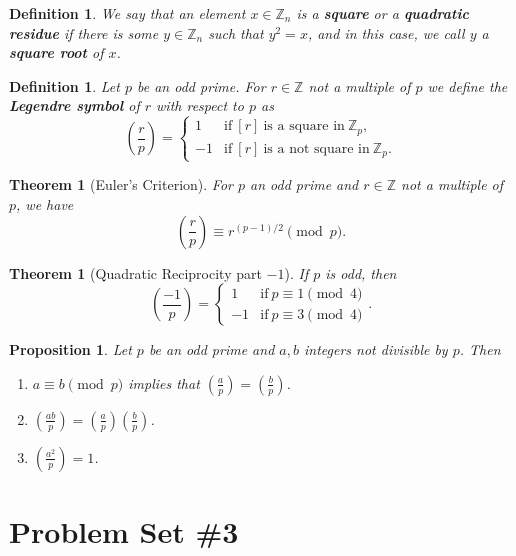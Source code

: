 \documentclass[12pt]{amsart}
\newcommand{\Z}{\mathbb{Z}}
\numberwithin{equation}{section}
\theoremstyle{plain} %
\newtheorem{thm}	[section]	{Theorem}
\newtheorem{prop}	[section]	{Proposition}
\newtheorem{defn}	[section]	{Definition}
\begin{document}
\begin{defn}
We say that an element $x\in \Z_n$ is a \textbf{square} or a \textbf{quadratic residue} if there is some $y\in \Z_n$ such that $y^2=x$, and in this case, we call $y$ a \textbf{square root} of $x$. 
\end{defn}

\begin{defn} Let $p$ be an odd prime. For $r\in \Z$ not a multiple of $p$ we define the \textbf{Legendre symbol}  of $r$ with respect to $p$ as 
\[ \left( \frac{r}{p} \right) = \begin{cases} 1 & \text{if} \ [r] \ \text{is a square in} \ \Z_p, \\ -1 & \text{if} \ [r] \ \text{is a not square in} \ \Z_p. \end{cases}\]
\end{defn}


\begin{thm}[Euler's Criterion] 
 For $p$ an odd prime and $r\in \Z$ not a multiple of $p$, we have
\[\displaystyle \left( \frac{r}{p} \right) \equiv r^{(p-1)/2} \pmod p.\]
\end{thm}



\begin{thm}[Quadratic Reciprocity part $-1$] If $p$ is odd, then
\[ \left( \frac{-1}{p} \right) = \begin{cases} 1 &\text{if} \ p\equiv 1 \pmod 4\\ -1 &\text{if} \ p\equiv 3 \pmod 4\end{cases}.\]
\end{thm}


\begin{prop} Let $p$ be an odd prime and $a,b$ integers not divisible by $p$. Then
\begin{enumerate}
\item $\displaystyle a\equiv b \pmod{p}$ implies that $\displaystyle \left(\frac{a}{p}\right) = \left(\frac{b}{p}\right)$.
\item $\displaystyle\left(\frac{ab}{p}\right) = \left(\frac{a}{p}\right) \left(\frac{b}{p}\right)$.
\item $\displaystyle\left(\frac{a^2}{p}\right) = 1$.
\end{enumerate}
\end{prop}

\section*{Problem Set \#3}
\end{document}
